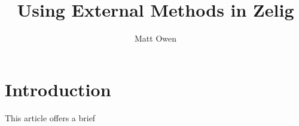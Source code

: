 \documentclass{article}
\title{Using External Methods in Zelig}
\author{Matt Owen}
\begin{document}
\maketitle

\section{Introduction}

This article offers a brief
\end{document}
